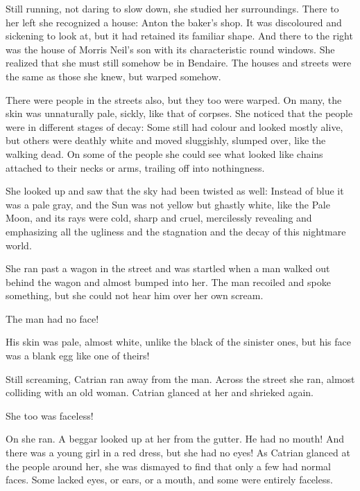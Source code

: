 Still running, not daring to slow down, she studied her surroundings. There to her left she recognized a house: Anton the baker's shop. It was discoloured and sickening to look at, but it had retained its familiar shape. And there to the right was the house of Morris Neil's son with its characteristic round windows. 
She realized that she must still somehow be in Bendaire. The houses and streets were the same as those she knew, but warped somehow. 


There were people in the streets also, but they too were warped. On many, the skin was unnaturally pale, sickly, like that of corpses. She noticed that the people were in different stages of decay: Some still had colour and looked mostly alive, but others were deathly white and moved sluggishly, slumped over, like the walking dead. On some of the people she could see what looked like chains attached to their necks or arms, trailing off into nothingness. 

She looked up and saw that the sky had been twisted as well: Instead of blue it was a pale gray, and the Sun was not yellow but ghastly white, like the Pale Moon, and its rays were cold, sharp and cruel, mercilessly revealing and emphasizing all the ugliness and the stagnation and the decay of this nightmare world. 

She ran past a wagon in the street and was startled when a man walked out behind the wagon and almost bumped into her. The man recoiled and spoke something, but she could not hear him over her own scream. 

The man had no face! 

His skin was pale, almost white, unlike the black of the sinister ones, but his face was a blank egg like one of theirs! 

Still screaming, Catrian ran away from the man. Across the street she ran, almost colliding with an old woman. Catrian glanced at her and shrieked again. 

She too was faceless! 

On she ran. A beggar looked up at her from the gutter. He had no mouth! And there was a young girl in a red dress, but she had no eyes! As Catrian glanced at the people around her, she was dismayed to find that only a few had normal faces. Some lacked eyes, or ears, or a mouth, and some were entirely faceless.

